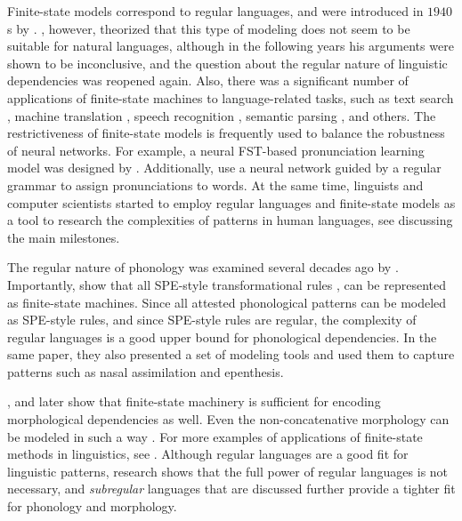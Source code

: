 Finite-state models correspond to regular languages, and were introduced in $1940$s by \cite{McCullochPitts1943}.
\cite{Chomsky1956}, however, theorized that this type of modeling does not seem to be suitable for natural languages, although in the following years his arguments were shown to be inconclusive, and the question about the regular nature of linguistic dependencies was reopened again.
Also, there was a significant number of applications of finite-state machines to language-related tasks, such as text search \citep{Thompson1968}, machine translation \citep{OncinaEtAl1994,KnightAlOnaizan1998,BangaloreRiccardi2002}, speech recognition \citep{Caseiro2003,MohriPereiraRiley2002,MohriPereiraRiley2008}, semantic parsing \citep{JonesJohnsonGoldwater2011,JonesJohnsonGoldwater2012}, and others.
The restrictiveness of finite-state models is frequently used to balance the robustness of neural networks.
For example, a neural FST-based pronunciation learning model was designed by \cite{Bruguier2017PronunciationLW}.
Additionally, \cite{RoarkEtAl2019} use a neural network guided by a regular grammar to assign pronunciations to words.
At the same time, linguists and computer scientists started to employ regular languages and finite-state models as a tool to research the complexities of patterns in human languages, see \cite{Hulden2014} discussing the main milestones.



The regular nature of phonology was examined several decades ago by \citep{Johnson1972,Kaplan1981PhonologicalRA,KaplanKay94}.
Importantly, \cite{KaplanKay94} show that all SPE-style transformational rules \citep{ChomskyHalle1968}, can be represented as finite-state machines.
Since all attested phonological patterns can be modeled as SPE-style rules, and since SPE-style rules are regular, the complexity of regular languages is a good upper bound for phonological dependencies.
In the same paper, they also presented a set of modeling tools and used them to capture patterns such as nasal assimilation and epenthesis.


\cite{Koskenniemi1983}, and later \cite{BeesleyKartunnen03} show that finite-state machinery is sufficient for encoding morphological dependencies as well.
Even the non-concatenative morphology can be modeled in such a way \citep{Kay1987,Beesley1996,Kiraz1996}.
For more examples of applications of finite-state methods in linguistics, see \citep{GildeaJurafsky1996,RocheSchabes1997,Hetherington2001,JurafskyMartin2009}.
Although regular languages are a good fit for linguistic patterns, research shows that the full power of regular languages is not necessary, and \emph{subregular} languages that are discussed further provide a tighter fit for phonology and morphology.


